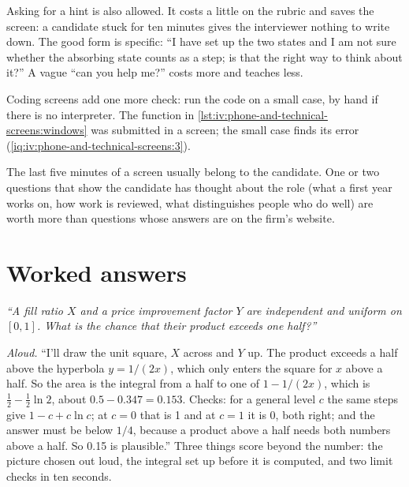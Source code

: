 Asking for a hint is also allowed. It costs a little on the rubric and saves the screen: a candidate stuck for
ten minutes gives the interviewer nothing to write down. The good form is specific: ``I have set up the two
states and I am not sure whether the absorbing state counts as a step; is that the right way to think about
it?'' A vague ``can you help me?'' costs more and teaches less.

Coding screens add one more check: run the code on a small case, by hand if there is no interpreter. The
function in \cref{lst:iv:phone-and-technical-screens:windows} was submitted in a screen; the small case finds
its error (\cref{iq:iv:phone-and-technical-screens:3}).

\label{lst:iv:phone-and-technical-screens:windows}

The last five minutes of a screen usually belong to the candidate. One or two questions that show the
candidate has thought about the role (what a first year works on, how work is reviewed, what distinguishes
people who do well) are worth more than questions whose answers are on the firm's website.

\section{Worked answers}

\begin{example}\label{ex:iv:phone-and-technical-screens:product}
\emph{``A fill ratio $X$ and a price improvement factor $Y$ are independent and uniform on $[0,1]$. What is the chance
that their product exceeds one half?''}

\emph{Aloud.} ``I'll draw the unit square, $X$ across and $Y$ up. The product exceeds a half above the hyperbola $y =
1/(2x)$, which only enters the square for $x$ above a half. So the area is the integral from a half to one of $1 -
1/(2x)$, which is $\tfrac12 - \tfrac12\ln 2$, about $0.5 - 0.347 = 0.153$. Checks: for a general level $c$ the same
steps give $1 - c + c\ln c$; at $c = 0$ that is 1 and at $c = 1$ it is 0, both right; and the answer must be below
$1/4$, because a product above a half needs both numbers above a half. So 0.15 is plausible.'' Three things score beyond the number: the picture chosen out loud, the integral set up
before it is computed, and two limit checks in ten seconds.
\end{example}

